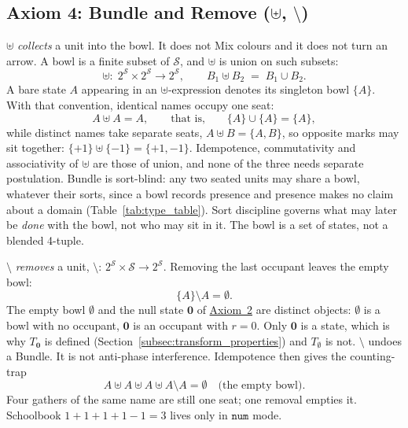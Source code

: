 \documentclass[12pt, a4paper]{article}
\begin{document}
\subsection{Axiom 4: Bundle and Remove ($\uplus$, $\setminus$)}
\label{subsec:axiom_idempotence}
$\uplus$ \emph{collects} a unit into the bowl. It does not Mix colours
and it does not turn an arrow. A bowl is a finite subset of
$\mathcal{S}$, and $\uplus$ is union on such subsets:
\[
\uplus:\; 2^{\mathcal{S}}\times 2^{\mathcal{S}}
\longrightarrow 2^{\mathcal{S}},
\qquad
B_1 \uplus B_2 \;=\; B_1 \cup B_2 .
\]
A bare state $A$ appearing in an $\uplus$-expression denotes its
singleton bowl $\{A\}$. With that convention, identical names occupy
one seat:
\begin{equation}
    A \uplus A = A,
    \qquad\text{that is,}\qquad
    \{A\}\cup\{A\}=\{A\},
    \label{eq:idempotence_formal}
\end{equation}
while distinct names take separate seats, $A\uplus B=\{A,B\}$, so
opposite marks may sit together:
$\{+1\}\uplus\{-1\}=\{+1,-1\}$.
Idempotence, commutativity and associativity of $\uplus$ are those of
union, and none of the three needs separate postulation.
Bundle is sort-blind: any two seated units may share a bowl, whatever
their sorts, since a bowl records presence and presence makes no claim
about a domain (Table~\ref{tab:type_table}). Sort discipline governs
what may later be \emph{done} with the bowl, not who may sit in it.
The bowl is a set of states, not a blended 4-tuple.

$\setminus$ \emph{removes} a unit,
$\setminus:\,2^{\mathcal{S}}\times\mathcal{S}\to 2^{\mathcal{S}}$.
Removing the last occupant leaves the empty bowl:
\begin{equation}
    \{A\}\setminus A = \emptyset.
    \label{eq:setminus_empty}
\end{equation}
The empty bowl $\emptyset$ and the null state $\mathbf{0}$ of
\hyperref[subsec:axiom_null]{Axiom~2} are distinct objects: $\emptyset$ is a
bowl with no occupant, $\mathbf{0}$ is an occupant with $r=0$. Only
$\mathbf{0}$ is a state, which is why $T_{\mathbf{0}}$ is defined
(Section~\ref{subsec:transform_properties}) and $T_{\emptyset}$ is
not.
$\setminus$ undoes a Bundle. It is not anti-phase interference.
Idempotence then gives the counting-trap
\begin{equation}
    A \uplus A \uplus A \uplus A \setminus A = \emptyset
    \quad\text{(the empty bowl)}.
    \label{eq:four_a_setminus}
\end{equation}
Four gathers of the same name are still one seat; one removal empties
it. Schoolbook $1+1+1+1-1=3$ lives only in $\mathtt{num}$ mode.
\end{document}
